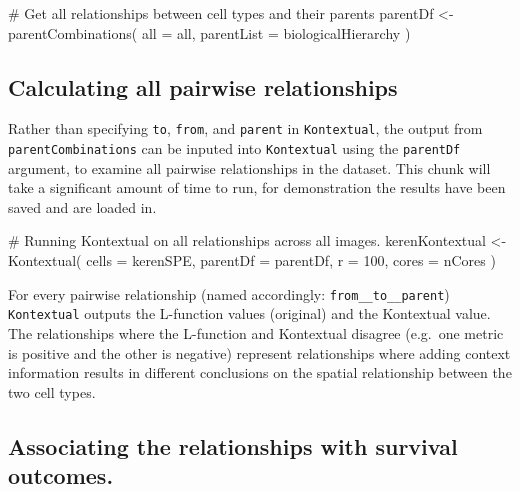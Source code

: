 \documentclass[
  letterpaper,
  DIV=11,
  numbers=noendperiod]{scrreprt}
\newenvironment{Shaded}{\begin{snugshade}}{\end{snugshade}}
\newcommand{\AttributeTok}[1]{\textcolor[rgb]{0.40,0.45,0.13}{#1}}
\newcommand{\CommentTok}[1]{\textcolor[rgb]{0.37,0.37,0.37}{#1}}
\newcommand{\DecValTok}[1]{\textcolor[rgb]{0.68,0.00,0.00}{#1}}
\newcommand{\FunctionTok}[1]{\textcolor[rgb]{0.28,0.35,0.67}{#1}}
\newcommand{\NormalTok}[1]{\textcolor[rgb]{0.00,0.23,0.31}{#1}}
\newcommand{\OtherTok}[1]{\textcolor[rgb]{0.00,0.23,0.31}{#1}}
\begin{document}
\begin{Shaded}
\begin{Highlighting}[]
\CommentTok{\# Get all relationships between cell types and their parents}
\NormalTok{parentDf }\OtherTok{\textless{}{-}} \FunctionTok{parentCombinations}\NormalTok{(}
  \AttributeTok{all =}\NormalTok{ all,}
  \AttributeTok{parentList =}\NormalTok{ biologicalHierarchy}
\NormalTok{)}
\end{Highlighting}
\end{Shaded}

\subsection{Calculating all pairwise
relationships}\label{calculating-all-pairwise-relationships}

Rather than specifying \texttt{to}, \texttt{from}, and \texttt{parent}
in \texttt{Kontextual}, the output from \texttt{parentCombinations} can
be inputed into \texttt{Kontextual} using the \texttt{parentDf}
argument, to examine all pairwise relationships in the dataset. This
chunk will take a significant amount of time to run, for demonstration
the results have been saved and are loaded in.

\begin{Shaded}
\begin{Highlighting}[]
\CommentTok{\# Running Kontextual on all relationships across all images.}
\NormalTok{kerenKontextual }\OtherTok{\textless{}{-}} \FunctionTok{Kontextual}\NormalTok{(}
  \AttributeTok{cells =}\NormalTok{ kerenSPE,}
  \AttributeTok{parentDf =}\NormalTok{ parentDf,}
  \AttributeTok{r =} \DecValTok{100}\NormalTok{,}
  \AttributeTok{cores =}\NormalTok{ nCores}
\NormalTok{)}
\end{Highlighting}
\end{Shaded}

For every pairwise relationship (named accordingly:
\texttt{from\_\_to\_\_parent}) \texttt{Kontextual} outputs the
L-function values (original) and the Kontextual value. The relationships
where the L-function and Kontextual disagree (e.g.~one metric is
positive and the other is negative) represent relationships where adding
context information results in different conclusions on the spatial
relationship between the two cell types.

\subsection{Associating the relationships with survival
outcomes.}\label{associating-the-relationships-with-survival-outcomes.}
\end{document}

